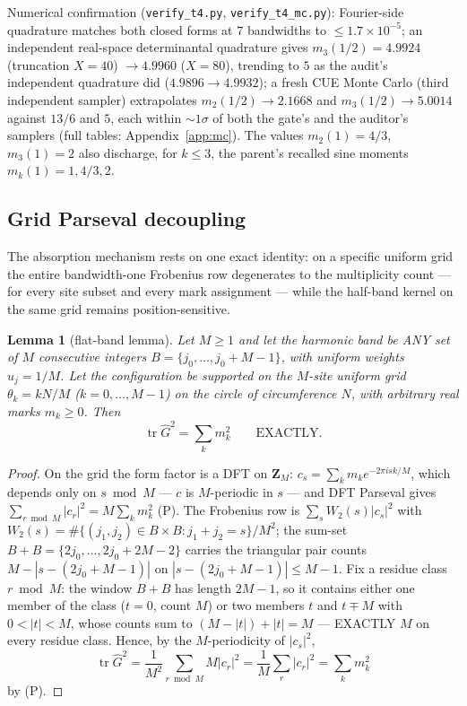 \documentclass[11pt]{article}
\theoremstyle{plain}
\newtheorem{lemma}[theorem]{Lemma}
\theoremstyle{definition}
\theoremstyle{remark}
\newcommand{\Z}{\mathbf{Z}}
\newcommand{\Gh}{\widehat{G}}
\newcommand{\tr}{\operatorname{tr}}
\begin{document}
Numerical confirmation (\texttt{verify\_t4.py}, \texttt{verify\_t4\_mc.py}):
Fourier-side quadrature matches both closed forms at $7$ bandwidths to
$\le 1.7 \times 10^{-5}$; an independent real-space determinantal quadrature gives
$m_3(1/2) = 4.9924$ (truncation $X = 40$) $\to 4.9960$ ($X = 80$), trending to
$5$ as the audit's independent quadrature did ($4.9896 \to 4.9932$); a fresh CUE
Monte Carlo (third independent sampler) extrapolates $m_2(1/2) \to 2.1668$ and
$m_3(1/2) \to 5.0014$ against $13/6$ and $5$, each within ${\sim}1\sigma$ of both
the gate's and the auditor's samplers (full tables: Appendix~\ref{app:mc}). The
values $m_2(1) = 4/3$, $m_3(1) = 2$ also discharge, for $k \le 3$, the parent's
recalled sine moments $m_k(1) = 1, 4/3, 2$.

\subsection{Grid Parseval decoupling}
\label{sec:decoupling}

The absorption mechanism rests on one exact identity: on a specific uniform grid
the entire bandwidth-one Frobenius row degenerates to the multiplicity count ---
for every site subset and every mark assignment --- while the half-band kernel on
the same grid remains position-sensitive.

\begin{lemma}[flat-band lemma]
\label{lem:flatband}
Let $M \ge 1$ and let the harmonic band be ANY set of $M$ consecutive integers
$B = \{j_0, \ldots, j_0 + M - 1\}$, with uniform weights $u_j = 1/M$. Let the
configuration be supported on the $M$-site uniform grid $\theta_k = k N/M$
($k = 0, \ldots, M - 1$) on the circle of circumference $N$, with arbitrary real
marks $m_k \ge 0$. Then
\[
  \tr \Gh^2 = \sum_k m_k^2 \qquad \text{EXACTLY.}
\]
\end{lemma}

\begin{proof}
On the grid the form factor is a DFT on $\Z_M$:
$c_s = \sum_k m_k e^{-2\pi i s k/M}$, which depends only on $s \bmod M$ --- $c$
is $M$-periodic in $s$ --- and DFT Parseval gives
$\sum_{r \bmod M} |c_r|^2 = M \sum_k m_k^2$ (P). The Frobenius row is
$\sum_s W_2(s) |c_s|^2$ with
$W_2(s) = \#\{(j_1, j_2) \in B \times B : j_1 + j_2 = s\}/M^2$; the sum-set
$B + B = \{2 j_0, \ldots, 2 j_0 + 2M - 2\}$ carries the triangular pair counts
$M - |s - (2 j_0 + M - 1)|$ on $|s - (2 j_0 + M - 1)| \le M - 1$. Fix a residue
class $r \bmod M$: the window $B + B$ has length $2M - 1$, so it contains either
one member of the class ($t = 0$, count $M$) or two members $t$ and $t \mp M$
with $0 < |t| < M$, whose counts sum to $(M - |t|) + |t| = M$ --- EXACTLY $M$ on
every residue class. Hence, by the $M$-periodicity of $|c_s|^2$,
\[
  \tr \Gh^2 = \frac{1}{M^2} \sum_{r \bmod M} M |c_r|^2
  = \frac{1}{M} \sum_r |c_r|^2 = \sum_k m_k^2
\]
by (P).
\end{proof}
\end{document}
